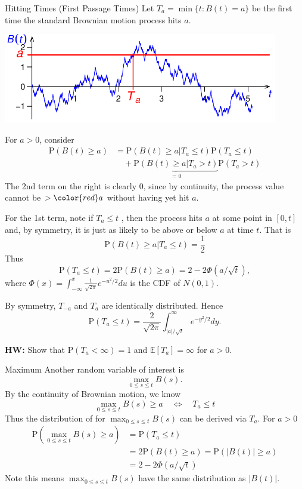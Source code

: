 \documentclass[letterpaper]{beamer}
\def\p{\mathrm P}
\def\E{\mathbb E}
\begin{document}
\begin{frame}{Hitting Times (First Passage Times)}
Let $T_a=\min\{t: B(t)=a\}$ be the first time the standard Brownian motion process hits {\color{red}$a$}. 
\begin{center}
\includegraphics[width=0.9\textwidth]{Lecture22_hitting_time.pdf}
\end{center}
For $a >0$, consider
\begin{align*}
\p(B(t)\ge a) &= \p(B(t)\ge a|T_a \le t)\p(T_a \le t)\\
&\quad+\underbrace{\p(B(t)\ge a|T_a > t)}_{=0}\p(T_a > t)
\end{align*}
The 2nd term on the right is clearly 0, since by continuity,
the process value cannot be $>{\color{red}a}$ without having yet hit {\color{red}$a$}.
\end{frame}
\begin{frame}
For the 1st term, note if $T_a \le t$ , then the process hits {\color{red}$a$} at some point in $[0, t]$ and, by symmetry, it
is just as likely to be above or below {\color{red}$a$} at time $t$. That is
$$\p(B(t)\ge a|T_a \le t)= \frac{1}{2}$$
Thus 
$$\p(T_a \le t)= 2\p(B(t)\ge a)=2-2\Phi(a/\sqrt{t}),$$
where $\Phi(x)=\int_{-\infty}^x\frac{1}{\sqrt{2\pi}}e^{-u^2/2}du$ is the CDF of $N(0,1)$.

By symmetry, $T_{-a}$ and $T_a$ are identically distributed. Hence
$$\p(T_a \le t)= \frac{2}{\sqrt{2\pi}}\int_{|a|/\sqrt{t}}^{\infty}e^{-y^2/2}dy.$$

{\bf HW:} Show that $\p(T_a<\infty)=1$ and $\E[T_a]=\infty$ for $a>0.$

\end{frame}
\begin{frame}{Maximum}
Another random variable of interest is
$$\max_{0\le s\le t}B(s).$$
By the continuity of Brownian motion, we know
$$\max_{0\le s\le t}B(s)\ge a \quad\Leftrightarrow\quad T_a\le t$$
Thus the distribution of for $\max_{0\le s\le t}B(s)$ can be derived via $T_a$. For $a >0$
\begin{align*}
\p\left(\max_{0\le s\le t}B(s) \ge a\right) &= \p(T_a \le t)\\
&= 2\p(B(t)\ge a)=\p(|B(t)|\ge a)\\
&=2-2\Phi(a/\sqrt{t})
\end{align*}
Note this means $\displaystyle{\max_{0\le s\le t}B(s)}$ have the same distribution as $|B(t)|$.
\end{frame}
\end{document}
